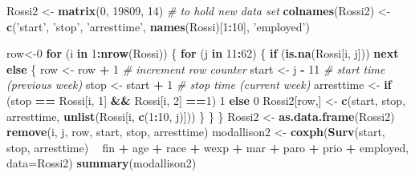 \documentclass[
]{book}
\newenvironment{Shaded}{\begin{snugshade}}{\end{snugshade}}
\newcommand{\CommentTok}[1]{\textcolor[rgb]{0.56,0.35,0.01}{\textit{#1}}}
\newcommand{\ControlFlowTok}[1]{\textcolor[rgb]{0.13,0.29,0.53}{\textbf{#1}}}
\newcommand{\DataTypeTok}[1]{\textcolor[rgb]{0.13,0.29,0.53}{#1}}
\newcommand{\DecValTok}[1]{\textcolor[rgb]{0.00,0.00,0.81}{#1}}
\newcommand{\KeywordTok}[1]{\textcolor[rgb]{0.13,0.29,0.53}{\textbf{#1}}}
\newcommand{\NormalTok}[1]{#1}
\newcommand{\OperatorTok}[1]{\textcolor[rgb]{0.81,0.36,0.00}{\textbf{#1}}}
\newcommand{\StringTok}[1]{\textcolor[rgb]{0.31,0.60,0.02}{#1}}
\begin{document}
\begin{Shaded}
\begin{Highlighting}[]
\NormalTok{Rossi2 <-}\StringTok{ }\KeywordTok{matrix}\NormalTok{(}\DecValTok{0}\NormalTok{, }\DecValTok{19809}\NormalTok{, }\DecValTok{14}\NormalTok{) }\CommentTok{# to hold new data set}
\KeywordTok{colnames}\NormalTok{(Rossi2) <-}\StringTok{ }\KeywordTok{c}\NormalTok{(}\StringTok{'start'}\NormalTok{, }\StringTok{'stop'}\NormalTok{, }\StringTok{'arresttime'}\NormalTok{, }\KeywordTok{names}\NormalTok{(Rossi)[}\DecValTok{1}\OperatorTok{:}\DecValTok{10}\NormalTok{], }\StringTok{'employed'}\NormalTok{)}

\NormalTok{row<-}\DecValTok{0}
\ControlFlowTok{for}\NormalTok{ (i }\ControlFlowTok{in} \DecValTok{1}\OperatorTok{:}\KeywordTok{nrow}\NormalTok{(Rossi)) \{ }
    \ControlFlowTok{for}\NormalTok{ (j }\ControlFlowTok{in} \DecValTok{11}\OperatorTok{:}\DecValTok{62}\NormalTok{) \{ }
        \ControlFlowTok{if}\NormalTok{ (}\KeywordTok{is.na}\NormalTok{(Rossi[i, j])) }\ControlFlowTok{next}
        \ControlFlowTok{else}\NormalTok{ \{}
\NormalTok{            row <-}\StringTok{ }\NormalTok{row }\OperatorTok{+}\StringTok{ }\DecValTok{1} \CommentTok{# increment row counter}
\NormalTok{            start <-}\StringTok{ }\NormalTok{j }\OperatorTok{-}\StringTok{ }\DecValTok{11} \CommentTok{# start time (previous week)}
\NormalTok{            stop <-}\StringTok{ }\NormalTok{start }\OperatorTok{+}\StringTok{ }\DecValTok{1} \CommentTok{# stop time (current week)}
\NormalTok{            arresttime <-}\StringTok{ }\ControlFlowTok{if}\NormalTok{ (stop }\OperatorTok{==}\StringTok{ }\NormalTok{Rossi[i, }\DecValTok{1}\NormalTok{] }\OperatorTok{&&}\StringTok{ }\NormalTok{Rossi[i, }\DecValTok{2}\NormalTok{] }\OperatorTok{==}\DecValTok{1}\NormalTok{) }\DecValTok{1} \ControlFlowTok{else} \DecValTok{0}
\NormalTok{            Rossi2[row,] <-}\StringTok{ }\KeywordTok{c}\NormalTok{(start, stop, arresttime, }\KeywordTok{unlist}\NormalTok{(Rossi[i, }\KeywordTok{c}\NormalTok{(}\DecValTok{1}\OperatorTok{:}\DecValTok{10}\NormalTok{, j)]))}
\NormalTok{            \}}
\NormalTok{        \}}
\NormalTok{\}}
\NormalTok{Rossi2 <-}\StringTok{ }\KeywordTok{as.data.frame}\NormalTok{(Rossi2)}
\KeywordTok{remove}\NormalTok{(i, j, row, start, stop, arresttime)}
\NormalTok{modallison2 <-}\StringTok{ }\KeywordTok{coxph}\NormalTok{(}\KeywordTok{Surv}\NormalTok{(start, stop, arresttime) }\OperatorTok{~}\StringTok{ }\NormalTok{fin }\OperatorTok{+}\StringTok{ }\NormalTok{age }\OperatorTok{+}\StringTok{ }\NormalTok{race }\OperatorTok{+}\StringTok{ }\NormalTok{wexp }\OperatorTok{+}\StringTok{ }\NormalTok{mar }\OperatorTok{+}\StringTok{ }\NormalTok{paro }\OperatorTok{+}\StringTok{ }\NormalTok{prio }\OperatorTok{+}\StringTok{ }\NormalTok{employed, }\DataTypeTok{data=}\NormalTok{Rossi2)}
\KeywordTok{summary}\NormalTok{(modallison2)}
\end{Highlighting}
\end{Shaded}
\end{document}
